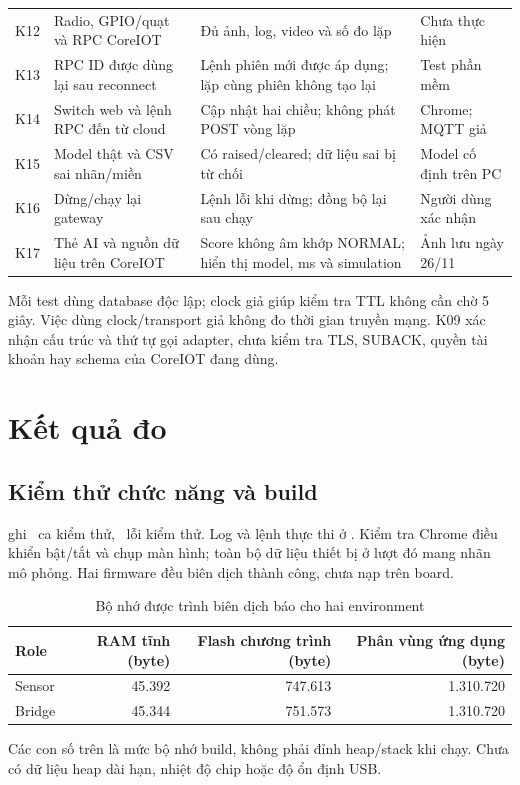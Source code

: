 \begin{longtable}{P{1.1cm}P{6.5cm}P{4.2cm}P{2.8cm}}
K12 & Radio, GPIO/quạt và RPC CoreIOT & Đủ ảnh, log, video và số đo lặp & Chưa thực hiện \\
K13 & RPC ID được dùng lại sau reconnect & Lệnh phiên mới được áp dụng; lặp cùng phiên không tạo lại & Test phần mềm \\
K14 & Switch web và lệnh RPC đến từ cloud & Cập nhật hai chiều; không phát POST vòng lặp & Chrome; MQTT giả \\
K15 & Model thật và CSV sai nhãn/miền & Có raised/cleared; dữ liệu sai bị từ chối & Model cố định trên PC \\
K16 & Dừng/chạy lại gateway & Lệnh lỗi khi dừng; đồng bộ lại sau chạy & Người dùng xác nhận \\
K17 & Thẻ AI và nguồn dữ liệu trên CoreIOT & Score không âm khớp NORMAL; hiển thị model, ms và simulation & Ảnh lưu ngày 26/11 \\
\bottomrule
\end{longtable}

Mỗi test dùng database độc lập; clock giả giúp kiểm tra TTL không cần chờ 5 giây. Việc dùng clock/transport giả không đo thời gian truyền mạng. K09 xác nhận cấu trúc và thứ tự gọi adapter, chưa kiểm tra TLS, SUBACK, quyền tài khoản hay schema của CoreIOT đang dùng.

\section{Kết quả đo}
\subsection{Kiểm thử chức năng và build}
 ghi \TestCount\ ca kiểm thử, \TestFailures\ lỗi kiểm thử. Log và lệnh thực thi ở . Kiểm tra Chrome điều khiển bật/tắt và chụp màn hình; toàn bộ dữ liệu thiết bị ở lượt đó mang nhãn mô phỏng. Hai firmware đều biên dịch thành công, chưa nạp trên board.

\begin{table}[H]\centering
\caption{Bộ nhớ được trình biên dịch báo cho hai environment}
\begin{tabular}{l r r r}
\toprule Role & RAM tĩnh (byte) & Flash chương trình (byte) & Phân vùng ứng dụng (byte) \\ \midrule
Sensor & 45.392 & 747.613 & 1.310.720 \\
Bridge & 45.344 & 751.573 & 1.310.720 \\
\bottomrule
\end{tabular}
\end{table}
Các con số trên là mức bộ nhớ build, không phải đỉnh heap/stack khi chạy. Chưa có dữ liệu heap dài hạn, nhiệt độ chip hoặc độ ổn định USB.

